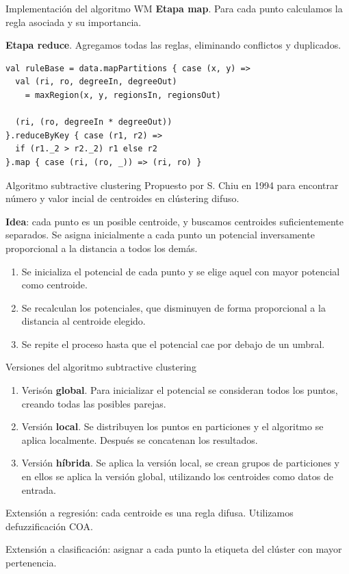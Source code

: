 \documentclass[10pt, spanish]{beamer}
\begin{document}
\begin{frame}[fragile]{Implementación del algoritmo WM}
  \textbf{Etapa map}. Para cada punto calculamos la regla asociada y su importancia.

  \textbf{Etapa reduce}. Agregamos todas las reglas, eliminando conflictos y duplicados.

  \vspace{1em}

  \begin{lstlisting}
val ruleBase = data.mapPartitions { case (x, y) =>
  val (ri, ro, degreeIn, degreeOut)
    = maxRegion(x, y, regionsIn, regionsOut)

  (ri, (ro, degreeIn * degreeOut))
}.reduceByKey { case (r1, r2) =>
  if (r1._2 > r2._2) r1 else r2
}.map { case (ri, (ro, _)) => (ri, ro) }
  \end{lstlisting}
\end{frame}


\begin{frame}{Algoritmo subtractive clustering}
  Propuesto por S. Chiu en 1994 para encontrar número y valor incial de centroides en clústering difuso.

  \textbf{Idea}: cada punto es un posible centroide, y buscamos centroides suficientemente separados. Se asigna inicialmente a cada punto un potencial inversamente proporcional a la distancia a todos los demás.

  \pause
  \begin{enumerate}
    \item Se inicializa el potencial de cada punto y se elige aquel con mayor potencial como centroide.
    \item Se recalculan los potenciales, que disminuyen de forma proporcional a la distancia al centroide elegido.
    \item Se repite el proceso hasta que el potencial cae por debajo de un umbral.
  \end{enumerate}
\end{frame}

\begin{frame}{Versiones del algoritmo subtractive clustering}
  \begin{enumerate}
    \item Verisón \textbf{global}. Para inicializar el potencial se consideran todos los puntos, creando todas las posibles parejas.
    \item Versión \textbf{local}. Se distribuyen los puntos en particiones y el algoritmo se aplica localmente. Después se concatenan los resultados.
    \item Versión \textbf{híbrida}. Se aplica la versión local, se crean grupos de particiones y en ellos se aplica la versión global, utilizando los centroides como datos de entrada.
  \end{enumerate}

  \pause

  Extensión a regresión: cada centroide es una regla difusa. Utilizamos defuzzificación COA.

  Extensión a clasificación: asignar a cada punto la etiqueta del clúster con mayor pertenencia.
\end{frame}
\end{document}
